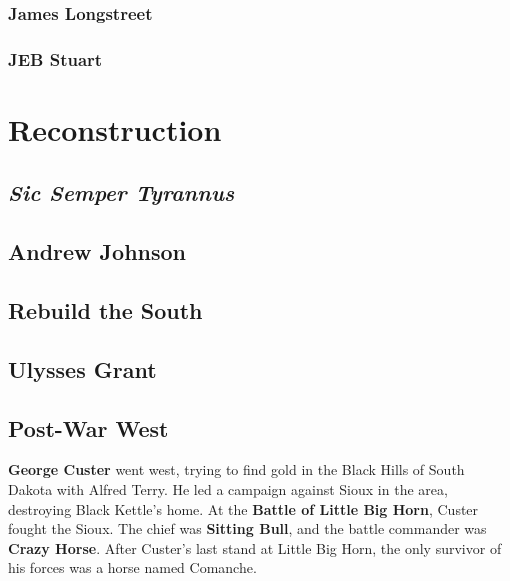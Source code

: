 \subsubsection*{James Longstreet}

\subsubsection*{JEB Stuart}

\section{Reconstruction}

\subsection*{\textit{Sic Semper Tyrannus}}

\subsection*{Andrew Johnson}

\subsection*{Rebuild the South}

\subsection*{Ulysses Grant}

\subsection*{Post-War West}

\textbf{George Custer} went west, trying to find gold in the Black Hills of South Dakota with Alfred Terry.
He led a campaign against Sioux in the area, destroying Black Kettle's home.
At the \textbf{Battle of Little Big Horn}, Custer fought the Sioux.
The chief was \textbf{Sitting Bull}, and the battle commander was \textbf{Crazy Horse}.
After Custer's last stand at Little Big Horn, the only survivor of his forces was a horse named Comanche.

